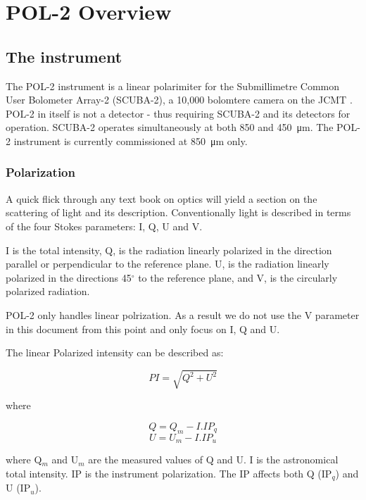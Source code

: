 \chapter{POL-2 Overview}
\label{sec:pol2}
\section{The instrument}

The POL-2 instrument is a linear polarimiter for the 
Submillimetre Common User Bolometer Array-2 (SCUBA-2), a 10,000 
bolomtere camera on the JCMT \cite{Friberg}\cite{Bastien2011}. 
POL-2 in itself is not a detector - thus requiring SCUBA-2 
and its detectors for operation. SCUBA-2 operates
simultaneously at both 850 and \SI{450}{\micro\metre}. The POL-2
instrument is currently commissioned at \SI{850}{\micro\metre} only.


\subsection*{Polarization}

A quick flick through any text book on optics will yield a section
on the scattering of light and its description. Conventionally light
is described in terms of the four Stokes parameters: I, Q, U and V.


I is the total intensity, Q, is the radiation linearly polarized in the
direction parallel or perpendicular to the reference plane. U, is the
radiation linearly polarized in the directions 45$^{\circ }$ to the
reference plane, and V, is the circularly polarized radiation. 

POL-2 only handles linear polrization. As a result we do not use
the V parameter in this document from this point and only focus
on I, Q and U.

The linear Polarized intensity can be described as:

\begin{equation}
PI = \sqrt{Q^{2}+U^{2}}
\end{equation}

where 

\begin{equation}
Q = Q_{m} - I . IP_{q} 
\end{equation}
\begin{equation}
U = U_{m} - I . IP_{u}
\end{equation}

where Q$_{m}$ and U$_{m}$ are the measured values of Q and U.
I is the astronomical total intensity.
IP is the instrument polarization. The IP affects both Q 
(IP$_{q}$) and U (IP$_{u}$).


